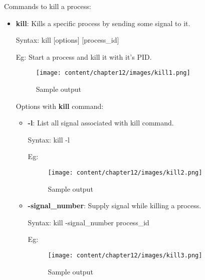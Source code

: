 \setlength{\columnsep}{3pt}
\begin{flushleft}
	Commands to kill a process:
	\begin{itemize}
		\item \textbf{kill}: Kills a specific process by sending some signal to it.
		\begin{tcolorbox}[breakable,notitle,boxrule=-0pt,colback=pink,colframe=pink]
			\color{black}
			\font=9pt
			Syntax: kill [options] [process\_id]
			\font=4pt
		\end{tcolorbox}
		Eg: Start a process and kill it with it's PID.
			\begin{figure}[h!]
				\centering
				\texttt{[image: content/chapter12/images/kill1.png]}
				\caption{Sample output}
				\label{fig:process23482}
			\end{figure}

		
		Options with \textbf{kill} command:	
		\begin{itemize}
			
			\item \textbf{-l}: List all signal associated with kill command.			
			\begin{tcolorbox}[breakable,notitle,boxrule=-0pt,colback=pink,colframe=pink]
				\color{black}
				\font=9pt
				Syntax: kill -l
				\font=4pt
			\end{tcolorbox}
			Eg: 
			\begin{figure}[h!]
				\centering
				\texttt{[image: content/chapter12/images/kill2.png]}
				\caption{Sample output}
				\label{fig:process2347}
			\end{figure}
			\newpage

			\item \textbf{-signal\_number}: Supply signal while killing a process.
			\begin{tcolorbox}[breakable,notitle,boxrule=-0pt,colback=pink,colframe=pink]
				\color{black}
				\font=9pt
				Syntax: kill -signal\_number process\_id
				\font=4pt
			\end{tcolorbox}		
			Eg:
			\begin{figure}[h!]
				\centering
				\texttt{[image: content/chapter12/images/kill3.png]}
				\caption{Sample output}
				\label{fig:process23456}
			\end{figure}
		

\end{itemize}
\end{itemize}
\end{flushleft}
